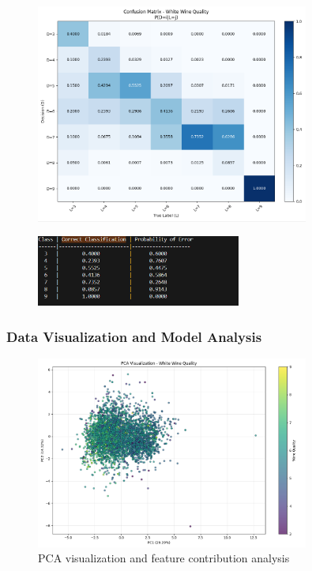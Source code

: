 \documentclass[12pt]{article}
\begin{document}
\begin{figure}[H]
    \centering
    \includegraphics[width=0.8\textwidth]{wine_confusion_matrix_result.png}
\end{figure}

\begin{figure}[H]
    \centering
    \includegraphics[width=0.6\textwidth]{wine_performance_result.png}
\end{figure}

\subsubsection{Data Visualization and Model Analysis}

\begin{figure}[H]
    \centering
    \includegraphics[width=0.8\textwidth]{wine_pca_analysis.png}
    \caption{PCA visualization and feature contribution analysis}
\end{figure}
\end{document}
